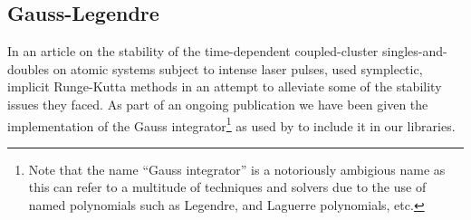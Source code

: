         \subsection{Gauss-Legendre}
            In an article on the stability of the time-dependent coupled-cluster
            singles-and-doubles on atomic systems subject to intense laser
            pulses, \citeauthor{pedersen2018symplectic}
            \cite{pedersen2018symplectic} used symplectic, implicit Runge-Kutta
            methods in an attempt to alleviate some of the stability issues they
            faced.
            As part of an ongoing publication we have been given the
            implementation of the Gauss integrator\footnote{%
                Note that the name ``Gauss integrator'' is a notoriously
                ambigious name as this can refer to a multitude of techniques
                and solvers due to the use of named polynomials such as
                Legendre, and Laguerre polynomials, etc.%
            } as used by \citeauthor{pedersen2018symplectic}
            \cite{pedersen2018symplectic} to include it in our libraries.
